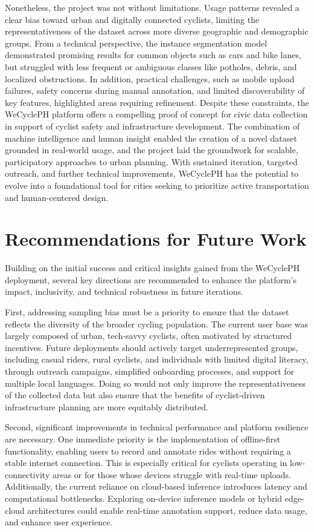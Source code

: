 Nonetheless, the project was not without limitations. Usage patterns revealed a clear bias toward urban and digitally connected cyclists, limiting the representativeness of the dataset across more diverse geographic and demographic groups. From a technical perspective, the instance segmentation model demonstrated promising results for common objects such as cars and bike lanes, but struggled with less frequent or ambiguous classes like potholes, debris, and localized obstructions. In addition, practical challenges, such as mobile upload failures, safety concerns during manual annotation, and limited discoverability of key features, highlighted areas requiring refinement.
Despite these constraints, the WeCyclePH platform offers a compelling proof of concept for civic data collection in support of cyclist safety and infrastructure development. The combination of machine intelligence and human insight enabled the creation of a novel dataset grounded in real-world usage, and the project laid the groundwork for scalable, participatory approaches to urban planning. With sustained iteration, targeted outreach, and further technical improvements, WeCyclePH has the potential to evolve into a foundational tool for cities seeking to prioritize active transportation and human-centered design.

\section{Recommendations for Future Work}

Building on the initial success and critical insights gained from the WeCyclePH deployment, several key directions are recommended to enhance the platform's impact, inclusivity, and technical robustness in future iterations.

First, addressing sampling bias must be a priority to ensure that the dataset reflects the diversity of the broader cycling population. The current user base was largely composed of urban, tech-savvy cyclists, often motivated by structured incentives. Future deployments should actively target underrepresented groups, including casual riders, rural cyclists, and individuals with limited digital literacy, through outreach campaigns, simplified onboarding processes, and support for multiple local languages. Doing so would not only improve the representativeness of the collected data but also ensure that the benefits of cyclist-driven infrastructure planning are more equitably distributed.

Second, significant improvements in technical performance and platform resilience are necessary. One immediate priority is the implementation of offline-first functionality, enabling users to record and annotate rides without requiring a stable internet connection. This is especially critical for cyclists operating in low-connectivity areas or for those whose devices struggle with real-time uploads. Additionally, the current reliance on cloud-based inference introduces latency and computational bottlenecks. Exploring on-device inference models or hybrid edge-cloud architectures could enable real-time annotation support, reduce data usage, and enhance user experience.

